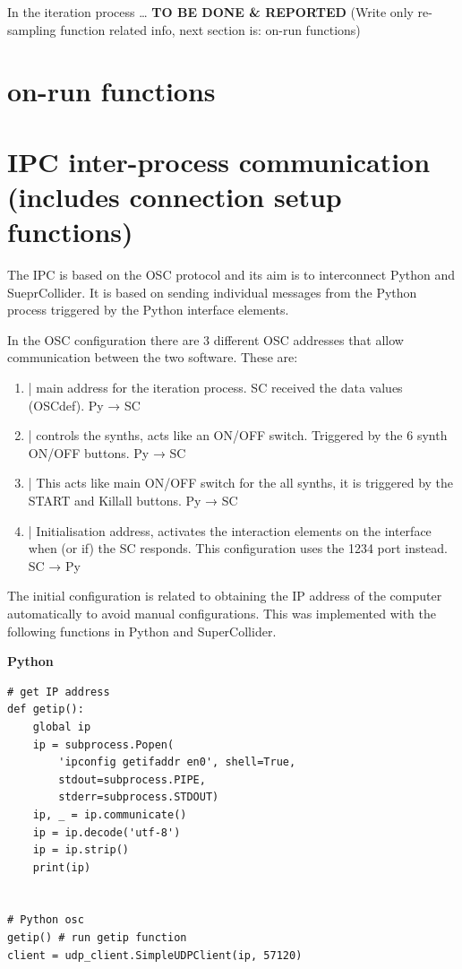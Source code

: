 \documentclass[11pt]{article}
\begin{document}
In the iteration process \ldots{} \textbf{TO BE DONE \& REPORTED}  (Write only re-sampling function related info, next section is: on-run functions)

\section{on-run functions}
\label{sec:org66ce3ff}
\section{IPC inter-process communication (includes connection setup functions)}
\label{sec:org5c532d5}
The IPC is based on the OSC protocol and its aim is to interconnect Python and SueprCollider.  It is based on sending individual messages from the Python process triggered by the Python interface elements.

In the OSC configuration there are 3 different OSC addresses that allow communication between the two software.  These are:
\begin{enumerate}
\item \label{org626b5a6} | main address for the iteration process.  SC received the data values (OSCdef).  Py → SC
\item \label{org92feb10} | controls the synths, acts like an ON/OFF switch.  Triggered by the 6 synth ON/OFF buttons. Py → SC
\item \label{org2c5d731} | This acts like main ON/OFF switch for the all synths, it is triggered by the START and Killall buttons. Py → SC
\item \label{org1654376} | Initialisation address, activates the interaction elements on the interface when (or if) the SC responds.  This configuration uses the 1234 port instead. SC → Py
\end{enumerate}

The initial configuration is related to obtaining the IP address of the computer automatically to avoid manual configurations.  This was implemented with the following functions in Python and SuperCollider.

\textbf{Python}

\begin{verbatim}
# get IP address
def getip():
    global ip
    ip = subprocess.Popen(
        'ipconfig getifaddr en0', shell=True,
        stdout=subprocess.PIPE,
        stderr=subprocess.STDOUT)
    ip, _ = ip.communicate()
    ip = ip.decode('utf-8')
    ip = ip.strip()
    print(ip)


# Python osc
getip() # run getip function
client = udp_client.SimpleUDPClient(ip, 57120)
\end{verbatim}
\end{document}
